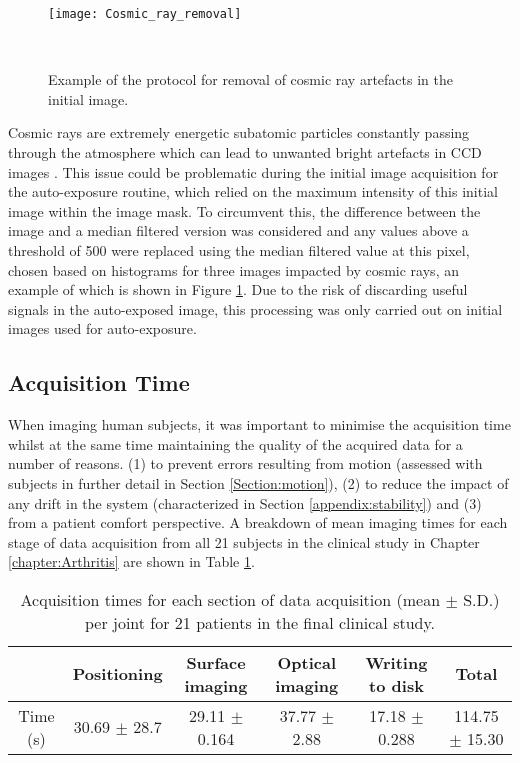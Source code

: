 \documentclass[twoside]{bhamthesis}
\theoremstyle{definition}
\begin{document}
\begin{figure}[!ht]
\texttt{[image: Cosmic\_ray\_removal]}
\centering
\caption{Example of the protocol for removal of cosmic ray artefacts in the initial image.}
  \label{fig:Cosmic_ray_removal}\
\end{figure}

Cosmic rays are extremely energetic subatomic particles constantly passing through the atmosphere which can lead to unwanted bright artefacts in CCD images \cite{imageEM2009}. This issue could be problematic during the initial image acquisition for the auto-exposure routine, which relied on the maximum intensity of this initial image within the image mask. To circumvent this, the difference between the image and a median filtered version was considered and any values above a threshold of 500 were replaced using the median filtered value at this pixel, chosen based on histograms for three images impacted by cosmic rays, an example of which is shown in Figure \ref{fig:Cosmic_ray_removal}. Due to the risk of discarding useful signals in the auto-exposed image, this processing was only carried out on initial images used for auto-exposure.

\subsection{Acquisition Time}
\label{Acquisition Time}

When imaging human subjects, it was important to minimise the acquisition time whilst at the same time maintaining the quality of the acquired data for a number of reasons. (1) to prevent errors resulting from motion (assessed with subjects in further detail in Section \ref{Section:motion}), (2) to reduce the impact of any drift in the system (characterized in Section 
\ref{appendix:stability}) and (3) from a patient comfort perspective. A breakdown of mean imaging times for each stage of data acquisition from all 21 subjects in the clinical study in Chapter \ref{chapter:Arthritis} are shown in Table \ref{tab:Acquisition_time}.

\bgroup
\def\arraystretch{1.2}
\begin{table}[!ht]
\small
\begin{center}
 \begin{tabular}{c| c c c c c} 
  & Positioning & Surface imaging & Optical imaging & Writing to disk & Total\\ 
 \hline
Time (s) & 30.69 $\pm$ 28.7  & 29.11 $\pm$ 0.164 & 37.77 $\pm$ 2.88 & 17.18 $\pm$ 0.288 & 114.75 $\pm$ 15.30 \\  
\end{tabular}
\caption{Acquisition times for each section of data acquisition (mean $\pm$ S.D.) per joint for 21 patients in the final clinical study.}
\label{tab:Acquisition_time}
\end{center}
\end{table}
\egroup
\end{document}
